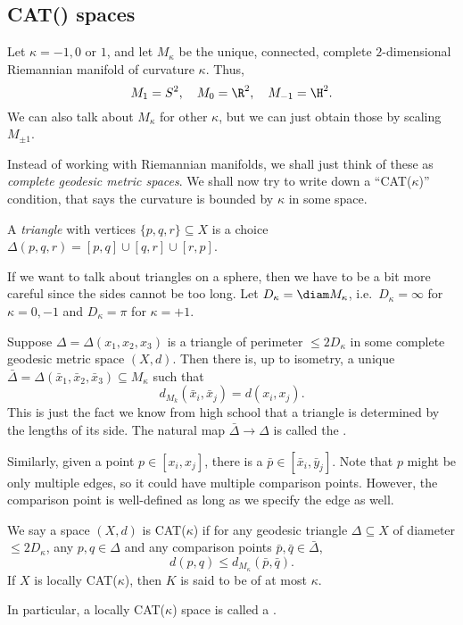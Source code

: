 \documentclass[a4paper]{article}
\begin{document}
\subsection{CAT() spaces}
Let $\kappa = -1, 0$ or $1$, and let $M_\kappa$ be the unique, connected, complete $2$-dimensional Riemannian manifold of curvature $\kappa$. Thus,
\[
  M_1 = S^2,\quad M_0 = \R^2,\quad M_{-1} = \H^2.
\]
We can also talk about $M_\kappa$ for other $\kappa$, but we can just obtain those by scaling $M_{\pm 1}$.

Instead of working with Riemannian manifolds, we shall just think of these as \emph{complete geodesic metric spaces}. We shall now try to write down a ``CAT($\kappa$)'' condition, that says the curvature is bounded by $\kappa$ in some space.

\begin{defi}[Triangle]
  A \emph{triangle} with vertices $\{p, q, r\} \subseteq X$ is a choice $\Delta(p, q, r) = [p, q] \cup [q, r] \cup [r, p]$.
\end{defi}
If we want to talk about triangles on a sphere, then we have to be a bit more careful since the sides cannot be too long. Let $D_\kappa = \diam M_\kappa$, i.e.\ $D_\kappa = \infty$ for $\kappa = 0, -1$ and $D_\kappa = \pi$ for $\kappa = +1$.

Suppose $\Delta = \Delta(x_1, x_2, x_3)$ is a triangle of perimeter $\leq 2 D_\kappa$ in some complete geodesic metric space $(X, d)$. Then there is, up to isometry, a unique  $\bar{\Delta} = \Delta(\bar{x}_1, \bar{x}_2, \bar{x}_3) \subseteq M_\kappa$ such that
\[
  d_{M_k}(\bar{x}_i, \bar{x}_j) = d(x_i, x_j).
\]
This is just the fact we know from high school that a triangle is determined by the lengths of its side. The natural map $\bar{\Delta} \to \Delta$ is called the .

Similarly, given a point $p \in [x_i, x_j]$, there is a  $\bar{p} \in [\bar{x}_i, \bar{y}_j]$. Note that $p$ might be only multiple edges, so it could have multiple comparison points. However, the comparison point is well-defined as long as we specify the edge as well.

\begin{defi} %
  We say a space $(X, d)$ is CAT($\kappa$) if for any geodesic triangle $\Delta \subseteq X$ of diameter $\leq 2 D_\kappa$, any $p, q \in \Delta$ and any comparison points $\bar{p}, \bar{q} \in \bar{\Delta}$,
  \[
    d(p, q) \leq d_{M_\kappa} (\bar{p}, \bar{q}).
  \]
  If $X$ is locally CAT($\kappa$), then $K$ is said to be of  at most $\kappa$.

  In particular, a locally CAT($\kappa$) space is called a .
\end{defi}
\end{document}
